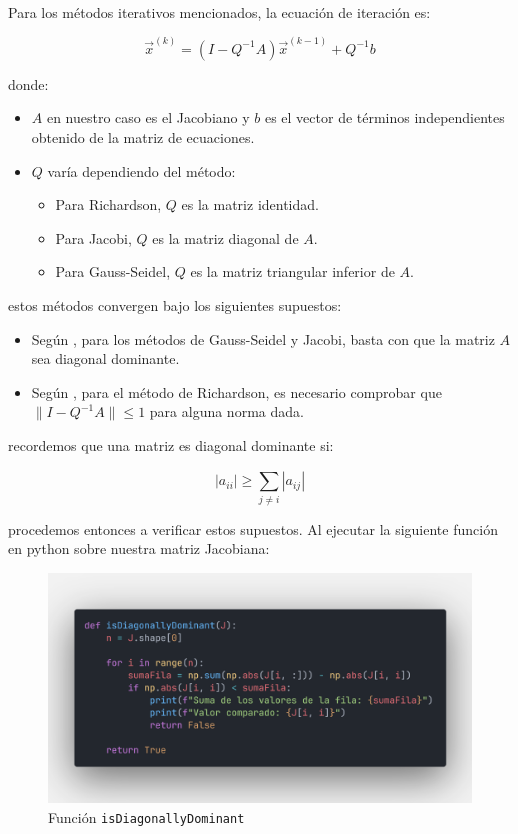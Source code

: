 \documentclass{article}
\begin{document}
  \paragraph{}
  Para los métodos iterativos mencionados, la ecuación de iteración es:

  \[
  \vec{x}^{(k)}=(I-Q^{-1}A)\vec{x}^{(k-1)}+Q^{-1}b
  \]

  donde:
  \begin{itemize}
      \item $A$ en nuestro caso es el Jacobiano y $b$ es el vector de términos independientes obtenido de la matriz de ecuaciones.
      \item $Q$ varía dependiendo del método:
      \begin{itemize}
          \item Para Richardson, $Q$ es la matriz identidad.
          \item Para Jacobi, $Q$ es la matriz diagonal de $A$.
          \item Para Gauss-Seidel, $Q$ es la matriz triangular inferior de $A$.
      \end{itemize}
  \end{itemize}

  estos métodos convergen bajo los siguientes supuestos:
  \begin{itemize}
      \item Según \cite{kincaid}, para los métodos de Gauss-Seidel y Jacobi, basta con que la matriz $A$ sea diagonal dominante.
      \item Según \cite{kincaid}, para el método de Richardson, es necesario comprobar que $\|I-Q^{-1}A\| \leq 1$ para alguna norma dada.
  \end{itemize}

  recordemos que una matriz es diagonal dominante si:

  \[
  |a_{ii}| \geq \sum_{j \neq i}^{} |a_{ij}|
  \]

  procedemos entonces a verificar estos supuestos. Al ejecutar la siguiente función en python sobre nuestra matriz Jacobiana:

  \begin{figure}[H]
      \centering
      \includegraphics[width=1\textwidth]{DiagDom.png}
      \caption{Función \texttt{isDiagonallyDominant}}
  \end{figure}
\end{document}
